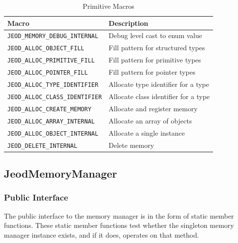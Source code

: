 \begin{table}[htp]
\centering
\caption{Primitive Macros}
\label{tab:primitives}
\vspace{1ex}
\begin{tabular}{||l|l|} \hline
{\bf Macro} & {\bf Description} \\ \hline \hline
\verb|JEOD_MEMORY_DEBUG_INTERNAL|  & Debug level cast to enum value \\
\verb|JEOD_ALLOC_OBJECT_FILL|      & Fill pattern for structured types \\
\verb|JEOD_ALLOC_PRIMITIVE_FILL|   & Fill pattern for primitive types \\
\verb|JEOD_ALLOC_POINTER_FILL|     & Fill pattern for pointer types \\
\verb|JEOD_ALLOC_TYPE_IDENTIFIER|  & Allocate type identifier for a type \\
\verb|JEOD_ALLOC_CLASS_IDENTIFIER| & Allocate class identifier for a type \\
\verb|JEOD_ALLOC_CREATE_MEMORY|    & Allocate and register memory \\
\verb|JEOD_ALLOC_ARRAY_INTERNAL|   & Allocate an array of objects \\
\verb|JEOD_ALLOC_OBJECT_INTERNAL|  & Allocate a single instance \\
\verb|JEOD_DELETE_INTERNAL|        & Delete memory \\
\hline
\end{tabular}
\end{table}

\subsection{JeodMemoryManager}
\subsubsection{Public Interface}
The public interface to the memory manager is in the form of static member
functions. These static member functions test whether the singleton memory
manager instance exists, and if it does, operates on that method. 

